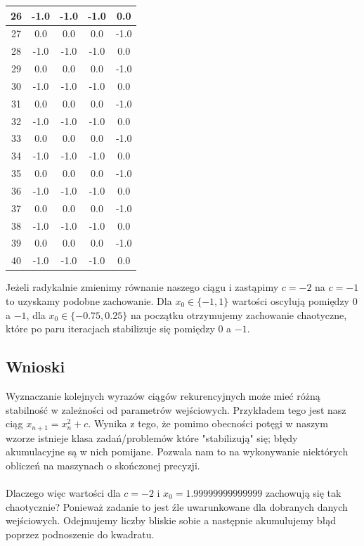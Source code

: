 \documentclass[10pt,a4paper, polish]{article}
\begin{document}
\begin{table}[H]
\begin{tabular}{|c|c|c|c|c|}
\hline
26 & -1.0 & -1.0 & -1.0 & 0.0 \\
\hline
27 & 0.0 & 0.0 & 0.0 & -1.0 \\
\hline
28 & -1.0 & -1.0 & -1.0 & 0.0 \\
\hline
29 & 0.0 & 0.0 & 0.0 & -1.0 \\
\hline
30 & -1.0 & -1.0 & -1.0 & 0.0 \\
\hline
31 & 0.0 & 0.0 & 0.0 & -1.0 \\
\hline
32 & -1.0 & -1.0 & -1.0 & 0.0 \\
\hline
33 & 0.0 & 0.0 & 0.0 & -1.0 \\
\hline
34 & -1.0 & -1.0 & -1.0 & 0.0 \\
\hline
35 & 0.0 & 0.0 & 0.0 & -1.0 \\
\hline
36 & -1.0 & -1.0 & -1.0 & 0.0 \\
\hline
37 & 0.0 & 0.0 & 0.0 & -1.0 \\
\hline
38 & -1.0 & -1.0 & -1.0 & 0.0 \\
\hline
39 & 0.0 & 0.0 & 0.0 & -1.0 \\
\hline
40 & -1.0 & -1.0 & -1.0 & 0.0 \\
\hline
\end{tabular}
\end{table}
Jeżeli radykalnie zmienimy równanie naszego ciągu i zastąpimy $c = -2$ na $c = -1$ to uzyskamy podobne zachowanie. Dla $x_0 \in \{-1, 1\}$ wartości oscylują pomiędzy $0$ a $-1$, dla $x_0 \in \{-0.75, 0.25\}$ na początku otrzymujemy zachowanie chaotyczne, które po paru iteracjach stabilizuje się pomiędzy $0$ a $-1$.
\subsection*{Wnioski}
Wyznaczanie kolejnych wyrazów ciągów rekurencyjnych może mieć różną stabilność w zależności od parametrów wejściowych. Przykładem tego jest nasz ciąg $x_{n+1} = x_n^2 + c$. Wynika z tego, że pomimo obecności potęgi w naszym wzorze istnieje klasa zadań/problemów które "stabilizują" się; błędy akumulacyjne są w nich pomijane. Pozwala nam to na wykonywanie niektórych obliczeń na maszynach o skończonej precyzji.\\\\
Dlaczego więc wartości dla $c=-2$ i $x_0=1.99999999999999$ zachowują się tak chaotycznie? Ponieważ zadanie to jest źle uwarunkowane dla dobranych danych wejściowych. Odejmujemy liczby bliskie sobie a następnie akumulujemy błąd poprzez podnoszenie do kwadratu.
\end{document}

